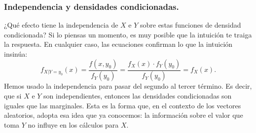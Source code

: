 \subsubsection{Independencia y densidades condicionadas.}

¿Qué efecto tiene la independencia de $X$ e $Y$ sobre estas funciones de densidad condicionada? Si lo piensas un momento, es muy posible que la intuición te traiga la respuesta. En cualquier caso, las ecuaciones confirman lo que la intuición insinúa:
\[
f_{X|Y=y_0}(x)=\dfrac{f(x,y_0)}{f_Y(y_0)}=\dfrac{f_X(x)\cdot f_Y(y_0)}{f_Y(y_0)}=f_X(x).
\]
Hemos usado la independencia para pasar del segundo al tercer término. Es decir, que si $X$ e $Y$ son independientes, entonces las densidades condicionadas son iguales que las marginales. Esta es la forma que, en el contexto de los vectores aleatorios, adopta esa idea que ya conocemos: la información sobre el valor que toma $Y$ no influye en los cálculos para $X$.

